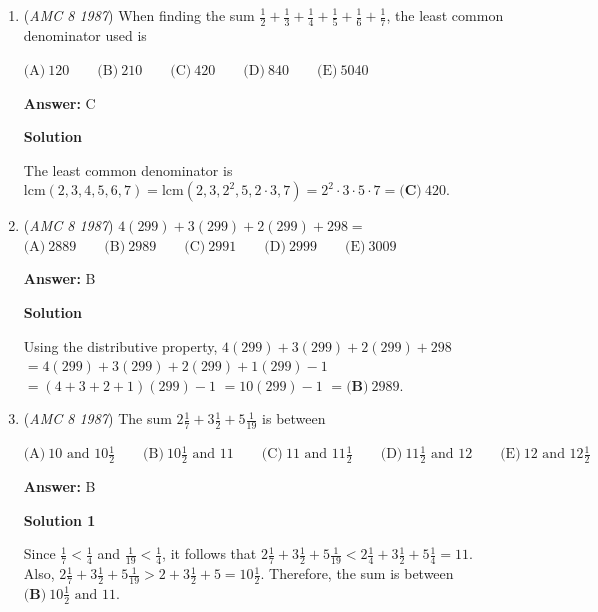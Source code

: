 \begin{enumerate}
 \textbf{Answer: }B



\textbf{Solution}

The smallest possible sum occurs if $A=B=1$, so it is $9876+132+11=10019$.  The largest possible sum occurs if $A=B=9$, so it is $9876+932+91=10899$.  Therefore, the sum is between $10019$ and $10899$, so it has $\boxed{\textbf{(B)}\ 5}$ digits.

 


	\item (\textit{AMC 8 1987}) When finding the sum $\frac{1}{2}+\frac{1}{3}+\frac{1}{4}+\frac{1}{5}+\frac{1}{6}+\frac{1}{7}$, the least common denominator used is


 $\text{(A)}\ 120 \qquad \text{(B)}\ 210 \qquad \text{(C)}\ 420 \qquad \text{(D)}\ 840 \qquad \text{(E)}\ 5040$

 \textbf{Answer: }C



\textbf{Solution}

The least common denominator is $\mathrm{lcm}(2, 3, 4, 5, 6, 7) = \mathrm{lcm}(2, 3, 2^2, 5, 2\cdot 3, 7) = 2^2 \cdot 3 \cdot 5 \cdot 7 = \boxed{\textbf{(C)}\ 420}$.

 


	\item (\textit{AMC 8 1987}) $4(299)+3(299)+2(299)+298=$
$\text{(A)}\ 2889 \qquad \text{(B)}\ 2989 \qquad \text{(C)}\ 2991 \qquad \text{(D)}\ 2999 \qquad \text{(E)}\ 3009$

 \textbf{Answer: }B



\textbf{Solution}

Using the distributive property, $4(299)+3(299)+2(299)+298$ $= 4(299)+3(299)+2(299)+1(299)-1$ $= (4+3+2+1)(299)-1$ $= 10(299)-1$ $= \boxed{\textbf{(B)}\ 2989}$.

 


	\item (\textit{AMC 8 1987}) The sum $2\frac17+3\frac12+5\frac{1}{19}$ is between


 $\text{(A)}\ 10\text{ and }10\frac12 \qquad \text{(B)}\ 10\frac12 \text{ and } 11 \qquad \text{(C)}\ 11\text{ and }11\frac12 \qquad \text{(D)}\ 11\frac12 \text{ and }12 \qquad \text{(E)}\ 12\text{ and }12\frac12$

 \textbf{Answer: }B



\textbf{Solution 1}

Since $\frac{1}{7}<\frac14$ and $\frac{1}{19}<\frac14$, it follows that $2\frac17+3\frac12+5\frac{1}{19}<2\frac14+3\frac12+5\frac14 =11$. Also, $2\frac17+3\frac12+5\frac{1}{19}>2+3\frac12+5=10\frac12$.  Therefore, the sum is between $\boxed{\textbf{(B)}\ 10\frac{1}{2}\text{ and }11}$.


\end{enumerate}
